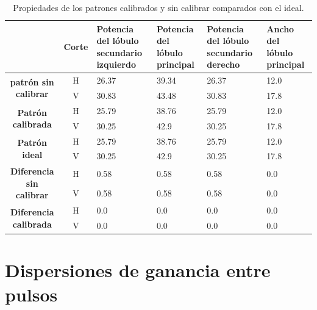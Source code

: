 \begin{table}[H]
  \footnotesize
  \centering
  \begin{tabular}{|c|c|p{2cm}|p{2cm}|p{2cm}|p{2cm}|}
    \cline{2-6}
    \multicolumn{1}{c|}{} & \textbf{Corte} & \textbf{Potencia del lóbulo secundario izquierdo} & \textbf{Potencia del lóbulo principal} &
    \textbf{Potencia del lóbulo secundario derecho} & \textbf{Ancho del lóbulo principal} \tabularnewline\hline
    \multirow{2}{*}{\textbf{patrón sin calibrar}} & H & 26.37 & 39.34 & 26.37 & 12.0 \tabularnewline\cline{2-6}
     & V & 30.83 & 43.48 & 30.83 & 17.8 \tabularnewline\hline
    \multirow{2}{*}{\textbf{Patrón calibrada}} & H & 25.79 & 38.76 & 25.79 & 12.0 \tabularnewline\cline{2-6}
     & V & 30.25 & 42.9 & 30.25 & 17.8 \tabularnewline\hline
    \multirow{2}{*}{\textbf{Patrón ideal}} & H & 25.79 & 38.76 & 25.79 & 12.0 \tabularnewline\cline{2-6}
     & V & 30.25 & 42.9 & 30.25 & 17.8 \tabularnewline\hline
    \multirow{2}{*}{\textbf{Diferencia sin calibrar}} & H & 0.58 & 0.58 & 0.58 & 0.0\tabularnewline\cline{2-6}
     & V & 0.58 & 0.58 & 0.58 & 0.0 \tabularnewline\hline
    \multirow{2}{*}{\textbf{Diferencia calibrada}} & H & 0.0 & 0.0 & 0.0 & 0.0 \tabularnewline\cline{2-6}
     & V & 0.0 & 0.0 & 0.0 & 0.0 \tabularnewline\hline
  \end{tabular}
  \caption{Propiedades de los patrones calibrados y sin calibrar comparados con el ideal.}
  \label{tab:comErrMutual10degRow}
\end{table}


\section{Dispersiones de ganancia entre pulsos}

